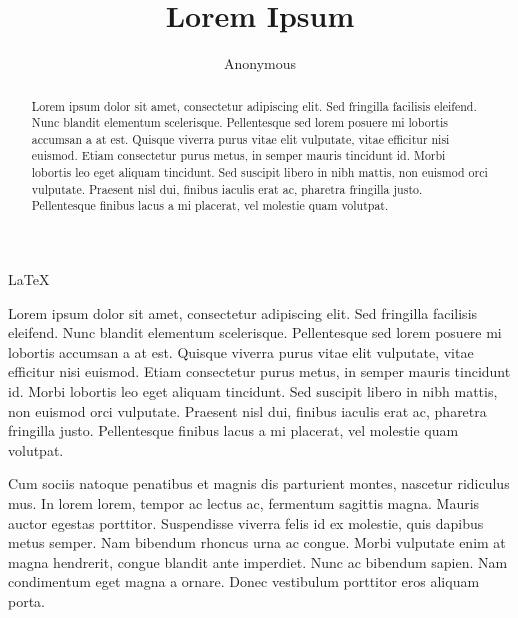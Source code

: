 \documentclass[5p]{elsarticle}
\begin{document}
	\begin{frontmatter}
		\title{Lorem Ipsum}

		\author{Anonymous}
		\address{Anonymous University}



		\begin{abstract}
			Lorem ipsum \cite{LoremIpusm} dolor sit amet, consectetur adipiscing elit. Sed fringilla facilisis eleifend. Nunc blandit elementum scelerisque. Pellentesque sed lorem posuere mi lobortis accumsan a at est. Quisque viverra purus vitae elit vulputate, vitae efficitur nisi euismod. Etiam consectetur purus metus, in semper mauris tincidunt id. Morbi lobortis leo eget aliquam tincidunt. Sed suscipit libero in nibh mattis, non euismod orci vulputate. Praesent nisl dui, finibus iaculis erat ac, pharetra fringilla justo. Pellentesque finibus lacus a mi placerat, vel molestie quam volutpat.
		\end{abstract}
		\begin{keyword}
   			\LaTeX
		\end{keyword}
	\end{frontmatter}
	
	\linenumbers
	
	Lorem ipsum dolor sit amet, consectetur adipiscing elit. Sed fringilla facilisis eleifend. Nunc blandit elementum scelerisque. Pellentesque sed lorem posuere mi lobortis accumsan a at est. Quisque viverra purus vitae elit vulputate, vitae efficitur nisi euismod. Etiam consectetur purus metus, in semper mauris tincidunt id. Morbi lobortis leo eget aliquam tincidunt. Sed suscipit libero in nibh mattis, non euismod orci vulputate. Praesent nisl dui, finibus iaculis erat ac, pharetra fringilla justo. Pellentesque finibus lacus a mi placerat, vel molestie quam volutpat.

	Cum sociis natoque penatibus et magnis dis parturient montes, nascetur ridiculus mus. In lorem lorem, tempor ac lectus ac, fermentum sagittis magna. Mauris auctor egestas porttitor. Suspendisse viverra felis id ex molestie, quis dapibus metus semper. Nam bibendum rhoncus urna ac congue. Morbi vulputate enim at magna hendrerit, congue blandit ante imperdiet. Nunc ac bibendum sapien. Nam condimentum eget magna a ornare. Donec vestibulum porttitor eros aliquam porta.
\end{document}

